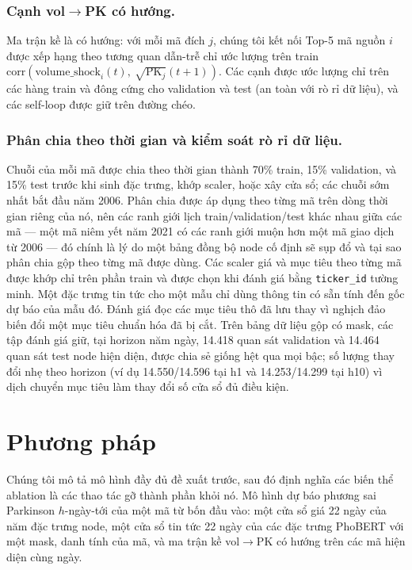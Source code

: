 \documentclass[runningheads]{llncs}
\begin{document}
\subsubsection{Cạnh vol$\to$PK có hướng.}
Ma trận kề là có hướng: với mỗi mã đích $j$, chúng tôi kết nối Top-5 mã nguồn $i$ được xếp hạng theo
tương quan dẫn-trễ chỉ ước lượng trên train
$\text{corr}(\text{volume\_shock}_i(t),\ \sqrt{\text{PK}_j}(t{+}1))$. Các cạnh được ước lượng chỉ trên
các hàng train và đông cứng cho validation và test (an toàn với rò rỉ dữ liệu), và các self-loop được
giữ trên đường chéo.

\subsubsection{Phân chia theo thời gian và kiểm soát rò rỉ dữ liệu.}
Chuỗi của mỗi mã được chia theo thời gian thành 70\% train, 15\% validation, và 15\% test trước khi sinh
đặc trưng, khớp scaler, hoặc xây cửa sổ; các chuỗi sớm nhất bắt đầu năm 2006. Phân chia được áp dụng theo
từng mã trên dòng thời gian riêng của nó, nên các ranh giới lịch train/validation/test khác nhau giữa các
mã --- một mã niêm yết năm 2021 có các ranh giới muộn hơn một mã giao dịch từ 2006 --- đó chính là lý do
một bảng đồng bộ node cố định sẽ sụp đổ và tại sao phân chia gộp theo từng mã được dùng. Các scaler giá
và mục tiêu theo từng mã được khớp chỉ trên phần train và được chọn khi đánh giá bằng \texttt{ticker\_id}
tường minh. Một đặc trưng tin tức cho một mẫu chỉ dùng thông tin có sẵn tính đến gốc dự báo của mẫu đó.
Đánh giá đọc các mục tiêu thô đã lưu thay vì nghịch đảo biến đổi một mục tiêu chuẩn hóa đã bị cắt. Trên
bảng dữ liệu gộp có mask, các tập đánh giá giữ, tại horizon năm ngày, 14.418 quan sát validation và
14.464 quan sát test node hiện diện, được chia sẻ giống hệt qua mọi bậc; số lượng thay đổi nhẹ theo
horizon (ví dụ 14.550/14.596 tại h1 và 14.253/14.299 tại h10) vì dịch chuyển mục tiêu làm thay đổi số cửa
sổ đủ điều kiện.

\section{Phương pháp}
\label{sec:method}
Chúng tôi mô tả mô hình đầy đủ đề xuất trước, sau đó định nghĩa các biến thể ablation là các thao tác gỡ
thành phần khỏi nó. Mô hình dự báo phương sai Parkinson $h$-ngày-tới của một mã từ bốn đầu vào: một cửa
sổ giá 22 ngày của năm đặc trưng node, một cửa sổ tin tức 22 ngày của các đặc trưng PhoBERT với một mask,
danh tính của mã, và ma trận kề vol$\to$PK có hướng trên các mã hiện diện cùng ngày.
\end{document}
